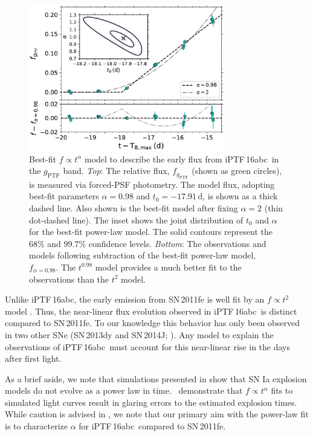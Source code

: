 \documentclass[twocolumn]{aastex61}
\newcommand{\abc}{iPTF\,16abc}
\begin{document}
\begin{figure}[!htb]
  \centering
  \includegraphics[width=3.35in]{early_lc.pdf}
  \caption{ Best-fit $f \propto t^\alpha$ model to describe the early flux
  from \abc\ in the $g_\mathrm{PTF}$ band. \textit{Top}: The relative flux,
  $f_{g_\mathrm{PTF}}$ (shown as green circles), is measured via forced-PSF
  photometry. The model flux, adopting best-fit parameters $\alpha=0.98$ and
  $t_0=-17.91\,\textrm{d}$, is shown as a thick dashed line. Also shown is
  the best-fit model after fixing $\alpha=2$ (thin dot-dashed line). The
  inset shows the joint distribution of $t_0$ and $\alpha$ for the best-fit
  power-law model. The solid contours represent the $68\%$ and $99.7\%$
  confidence levels. \textit{Bottom}: The observations and models following
  subtraction of the best-fit power-law model, $f_{\alpha = 0.98}$. The
  $t^{0.98}$ model provides a much better fit to the observations than the
  $t^2$ model.}
  \label{fig:early_lc_fit}
\end{figure}

Unlike \abc, the early emission from SN\,2011fe is well fit by an $f \propto
t^2$ model \citep{2011Natur.480..344N}. Thus, the near-linear flux evolution
observed in \abc\ is distinct compared to SN\,2011fe. To our knowledge this
behavior has only been observed in two other SNe (SN\,2013dy and SN\,2014J;
\citealt{2013ApJ...778L..15Z,2014ApJ...783L..24Z,2015ApJ...799..106G}). Any
model to explain the observations of \abc\ must account for this near-linear
rise in the days after first light.

As a brief aside, we note that simulations presented in
\citet{2017MNRAS.472.2787N} show that SN Ia explosion models do not evolve
as a power law in time. \citeauthor{2017MNRAS.472.2787N}\ demonstrate that
$f \propto t^\alpha$ fits to simulated light curves result in glaring errors
to the estimated explosion times. While caution is advised in
\citet{2017MNRAS.472.2787N}, we note that our primary aim with the power-law
fit is to characterize $\alpha$ for \abc\ compared to SN\,2011fe.
\end{document}
